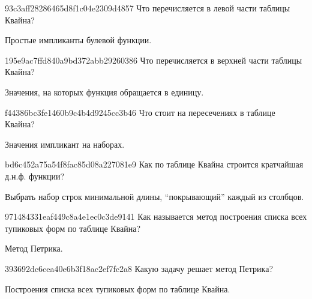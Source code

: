 \begin{note}{93c3aff28286465d8f1c04e2309d4857}
    Что перечисляется в левой части таблицы Квайна?

    \begin{cloze}{1}
        Простые импликанты булевой функции.
    \end{cloze}
\end{note}

\begin{note}{195e9ac7ffd840a9bd372abb29260386}
    Что перечисляется в верхней части таблицы Квайна?

    \begin{cloze}{1}
        Значения, на которых функция обращается в единицу.
    \end{cloze}
\end{note}

\begin{note}{f44386bc3fe1460b9c4b4d9245cc3b46}
    Что стоит на пересечениях в таблице Квайна?

    \begin{cloze}{1}
        Значения импликант на наборах.
    \end{cloze}
\end{note}

\begin{note}{bd6c452a75a54f8fac85d08a227081e9}
    Как по таблице Квайна строится кратчайшая д.н.ф. функции?

    \begin{cloze}{1}
        Выбрать набор строк минимальной длины, ``покрывающий'' каждый из столбцов.
    \end{cloze}
\end{note}

\begin{note}{971484331eaf449c8a4e1ec0c3de9141}
    Как называется метод построения списка всех тупиковых форм по таблице Квайна?

    \begin{cloze}{1}
        Метод Петрика.
    \end{cloze}
\end{note}

\begin{note}{393692dc6cea40e6b3f18ac2ef7fc2a8}
    Какую задачу решает метод Петрика?

    \begin{cloze}{1}
        Построения списка всех тупиковых форм по таблице Квайна.
    \end{cloze}
\end{note}

